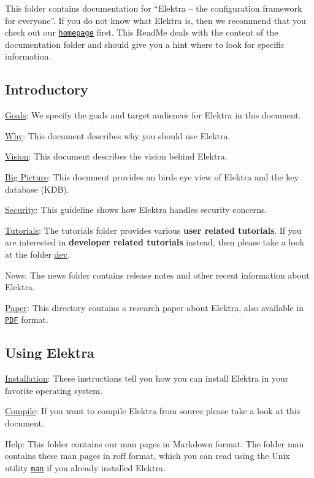 This folder contains documentation for “\+Elektra – the configuration framework for everyone”. If you do not know what Elektra is, then we recommend that you check out our \href{https://www.libelektra.org/home}{\tt homepage} first. This Read\+Me deals with the content of the documentation folder and should give you a hint where to look for specific information.

\subsection*{Introductory}


\begin{DoxyItemize}
\item \hyperlink{doc_GOALS_md}{Goals}\+: We specify the goals and target audiences for Elektra in this document.
\item \hyperlink{doc_WHY_md}{Why}\+: This document describes why you should use Elektra.
\item \hyperlink{doc_VISION_md}{Vision}\+: This document describes the vision behind Elektra.
\item \hyperlink{doc_BIGPICTURE_md}{Big Picture}\+: This document provides an birds eye view of Elektra and the key database (K\+DB).
\item \hyperlink{doc_SECURITY_md}{Security}\+: This guideline shows how Elektra handles security concerns.
\item \hyperlink{md_doc_tutorials_README_doc_tutorials_README_md}{Tutorials}\+: The tutorials folder provides various {\bfseries user related tutorials}. If you are interested in {\bfseries developer related tutorials} instead, then please take a look at the folder \hyperlink{md_doc_dev_README_doc_dev_README_md}{dev}.
\item News\+: The news folder contains release notes and other recent information about Elektra.
\item \hyperlink{doc_paper_README_md}{Paper}\+: This directory contains a research paper about Elektra, also available in \href{http://joss.theoj.org/papers/10.21105/joss.00044}{\tt P\+DF} format.
\end{DoxyItemize}

\subsection*{Using Elektra}


\begin{DoxyItemize}
\item \hyperlink{doc_INSTALL_md}{Installation}\+: These instructions tell you how you can install Elektra in your favorite operating system.
\item \hyperlink{doc_COMPILE_md}{Compile}\+: If you want to compile Elektra from source please take a look at this document.
\item Help\+: This folder contains our man pages in Markdown format. The folder man contains these man pages in roff format, which you can read using the Unix utility \href{https://en.wikipedia.org/wiki/Man_page}{\tt {\ttfamily man}} if you already installed Elektra.
\end{DoxyItemize}

